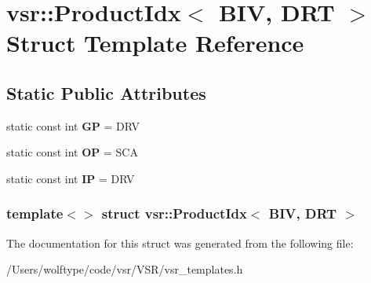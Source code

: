 \hypertarget{structvsr_1_1_product_idx_3_01_b_i_v_00_01_d_r_t_01_4}{\section{vsr\-:\-:Product\-Idx$<$ B\-I\-V, D\-R\-T $>$ Struct Template Reference}
\label{structvsr_1_1_product_idx_3_01_b_i_v_00_01_d_r_t_01_4}
}
\subsection*{Static Public Attributes}
\begin{DoxyCompactItemize}
\item 
\hypertarget{structvsr_1_1_product_idx_3_01_b_i_v_00_01_d_r_t_01_4_a884d93c7e53702277f9353cfa91420d2}{static const int {\bfseries G\-P} = D\-R\-V}\label{structvsr_1_1_product_idx_3_01_b_i_v_00_01_d_r_t_01_4_a884d93c7e53702277f9353cfa91420d2}

\item 
\hypertarget{structvsr_1_1_product_idx_3_01_b_i_v_00_01_d_r_t_01_4_a0d6f405ba42fc4d5cf8751042d0c8f4b}{static const int {\bfseries O\-P} = S\-C\-A}\label{structvsr_1_1_product_idx_3_01_b_i_v_00_01_d_r_t_01_4_a0d6f405ba42fc4d5cf8751042d0c8f4b}

\item 
\hypertarget{structvsr_1_1_product_idx_3_01_b_i_v_00_01_d_r_t_01_4_a4e499631e8023d29de37574bc2737f76}{static const int {\bfseries I\-P} = D\-R\-V}\label{structvsr_1_1_product_idx_3_01_b_i_v_00_01_d_r_t_01_4_a4e499631e8023d29de37574bc2737f76}

\end{DoxyCompactItemize}
\subsubsection*{template$<$$>$ struct vsr\-::\-Product\-Idx$<$ B\-I\-V, D\-R\-T $>$}



The documentation for this struct was generated from the following file\-:\begin{DoxyCompactItemize}
\item 
/\-Users/wolftype/code/vsr/\-V\-S\-R/vsr\-\_\-templates.\-h\end{DoxyCompactItemize}
